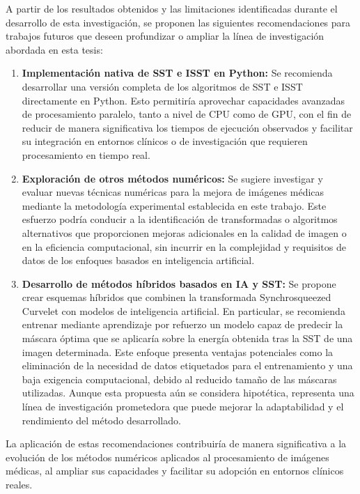 \begin{recomendations}

    A partir de los resultados obtenidos y las limitaciones identificadas durante el desarrollo de esta investigación, se proponen las siguientes recomendaciones para trabajos futuros que deseen profundizar o ampliar la línea de investigación abordada en esta tesis:

    \begin{enumerate}
    \item \textbf{Implementación nativa de SST e ISST en Python:} Se recomienda desarrollar una versión completa de los algoritmos de SST e ISST directamente en Python. Esto permitiría aprovechar capacidades avanzadas de procesamiento paralelo, tanto a nivel de CPU como de GPU, con el fin de reducir de manera significativa los tiempos de ejecución observados y facilitar su integración en entornos clínicos o de investigación que requieren procesamiento en tiempo real.

    \item \textbf{Exploración de otros métodos numéricos:} Se sugiere investigar y evaluar nuevas técnicas numéricas para la mejora de imágenes médicas mediante la metodología experimental establecida en este trabajo. Este esfuerzo podría conducir a la identificación de transformadas o algoritmos alternativos que proporcionen mejoras adicionales en la calidad de imagen o en la eficiencia computacional, sin incurrir en la complejidad y requisitos de datos de los enfoques basados en inteligencia artificial.

    \item \textbf{Desarrollo de métodos híbridos basados en IA y SST:} Se propone crear esquemas híbridos que combinen la transformada Synchrosqueezed Curvelet con modelos de inteligencia artificial. En particular, se recomienda entrenar mediante aprendizaje por refuerzo un modelo capaz de predecir la máscara óptima que se aplicaría sobre la energía obtenida tras la SST de una imagen determinada. Este enfoque presenta ventajas potenciales como la eliminación de la necesidad de datos etiquetados para el entrenamiento y una baja exigencia computacional, debido al reducido tamaño de las máscaras utilizadas. Aunque esta propuesta aún se considera hipotética, representa una línea de investigación prometedora que puede mejorar la adaptabilidad y el rendimiento del método desarrollado.
    \end{enumerate}

    \bigskip

    La aplicación de estas recomendaciones contribuiría de manera significativa a la evolución de los métodos numéricos aplicados al procesamiento de imágenes médicas, al ampliar sus capacidades y facilitar su adopción en entornos clínicos reales.

\end{recomendations}

